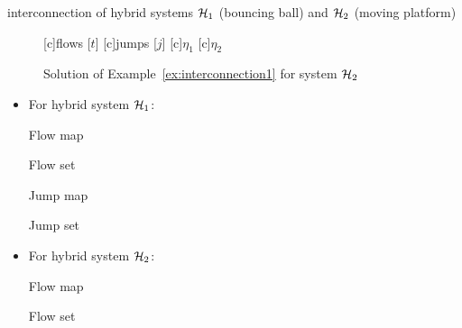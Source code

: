 \begin{example}{interconnection of hybrid systems $\mathcal{H}_1$ (bouncing ball) and $\mathcal{H}_2$ (moving platform)}
\begin{figure}[ht]
  \centering
  [c]{flows [$t$]}
  [c]{jumps [$j$]}
  [c]{$\eta_1$}
  [c]{$\eta_2$}
\qquad
{}
\caption{Solution of Example~\ref{ex:interconnection1} for system $\mathcal{H}_2$}
\end{figure}


\begin{itemize}
\item For hybrid system $\mathcal{H}_1$:

Flow map
\label{scr:f}

Flow set
\label{scr:C}

Jump map
\label{scr:g}

Jump set
\label{scr:D}

\item For hybrid system $\mathcal{H}_2$:

Flow map
\label{scr:f2}

Flow set
\label{scr:C2}


\end{itemize}
\end{example}
